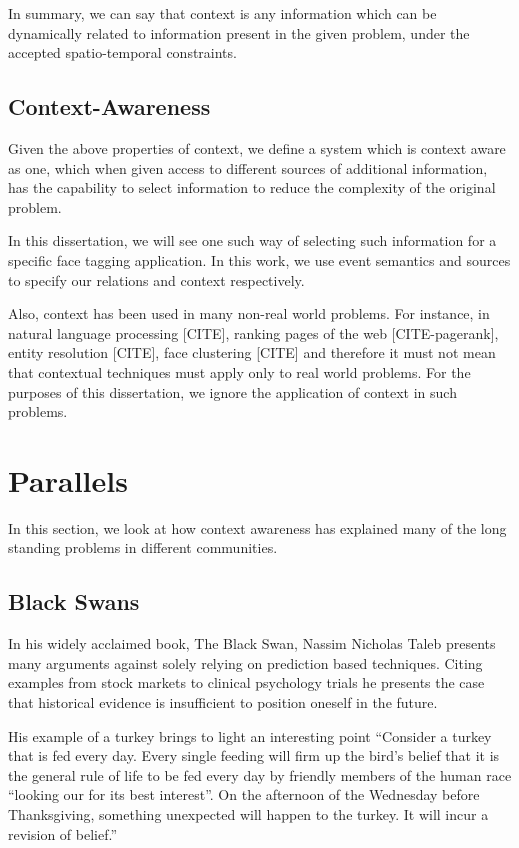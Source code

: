 In summary, we can say that context is any information which can be dynamically related to information present in the given problem, under the accepted spatio-temporal constraints.

\subsection{Context-Awareness}
Given the above properties of context, we define a system which is context aware as one, which when given access to different sources of additional information, has the capability to select information to reduce the complexity of the original problem.

In this dissertation, we will see one such way of selecting such information for a specific face tagging application. In this work, we use event semantics and sources to specify our relations and context respectively.

Also, context has been used in many non-real world problems. For instance, in natural language processing [CITE], ranking pages of the web [CITE-pagerank], entity resolution [CITE], face clustering [CITE] and therefore it must not mean that contextual techniques must apply only to real world problems. For the purposes of this dissertation, we ignore the application of context in such problems.

\section{Parallels}

In this section, we look at how context awareness has explained many of the long standing problems in different communities.

\subsection{Black Swans}
In his widely acclaimed book, The Black Swan, Nassim Nicholas Taleb presents many arguments against solely relying on prediction based techniques. Citing examples from stock markets to clinical psychology trials he presents the case that historical evidence is insufficient to position oneself in the future. 

His example of a turkey brings to light an interesting point ``Consider a turkey that is fed every day. Every single feeding will firm up the bird's belief that it is the general rule of life to be fed every day by friendly members of the human race ``looking our for its best interest''. On the afternoon of the Wednesday before Thanksgiving, something unexpected will happen to the turkey. It will incur a revision of belief.''

